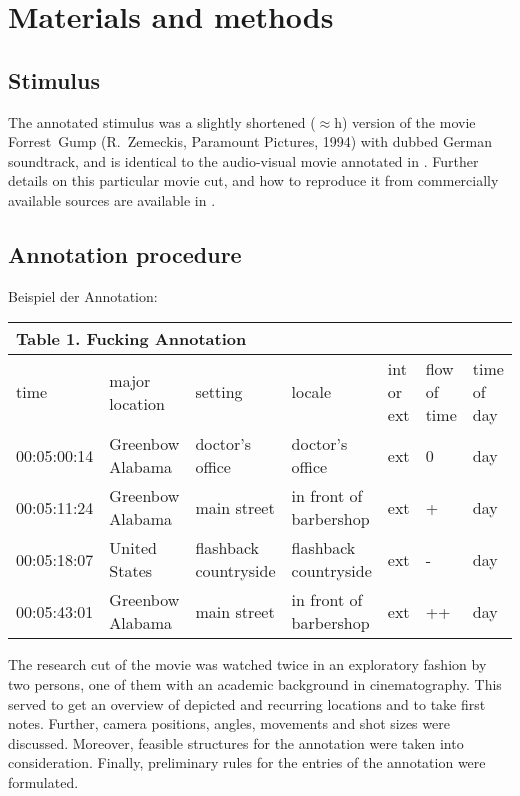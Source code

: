 \documentclass[10pt,a4paper,twocolumn]{article}
\begin{document}
\section*{Materials and methods}

\subsection*{Stimulus}

The annotated stimulus was a slightly shortened ($\approx$\unit[2]{h}) version
of the movie Forrest~Gump (R.~Zemeckis, Paramount Pictures, 1994) with dubbed
German soundtrack, and is identical to the audio-visual movie annotated in
\cite{LRS+2015}. Further details on this particular movie cut, and how to
reproduce it from commercially available sources are available in
\cite{HAK+16}.


\subsection*{Annotation procedure}


Beispiel der Annotation: 
\begin{table}[h]
\begin{tabular}{lllllll}
\multicolumn{7}{l}{Table 1. Fucking Annotation}\tabularnewline
\hline 
time & major location & setting & locale & int or ext & flow of time & time of day\tabularnewline
00:05:00:14  & Greenbow Alabama  & doctor's office  & doctor's office  & ext  & 0 & day\tabularnewline
00:05:11:24  & Greenbow Alabama  & main street  & in front of barbershop  & ext  & + & day\tabularnewline
00:05:18:07  & United States  & flashback countryside  & flashback countryside  & ext  & - & day\tabularnewline
00:05:43:01 & Greenbow Alabama  & main street  & in front of barbershop  & ext  & ++ & day\tabularnewline
\hline 
\end{tabular}
\end{table}


The research cut of the movie was watched twice in an exploratory
fashion by two persons, one of them with an academic background
in cinematography. This served to get an overview of depicted and
recurring locations and to take first notes. Further, camera positions,
angles, movements and shot sizes were discussed. Moreover, feasible
structures for the annotation were taken into consideration. Finally,
preliminary rules for the entries of the annotation were formulated.
\end{document}

